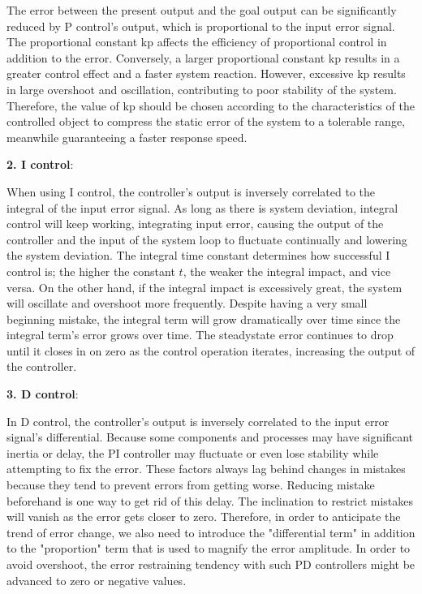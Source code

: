 \documentclass[12pt, a4paper, oneside]{report}
\begin{document}
The error between the present output and the goal output can be significantly reduced by P control's output, which is proportional to the input error signal. The proportional constant kp affects the efficiency of proportional control in addition to the error. Conversely, a larger proportional constant kp results in a greater control effect and a faster system reaction. However, excessive kp results in large overshoot and oscillation, contributing to poor stability of the system. Therefore, the value of kp should be chosen according to the characteristics of the controlled object to compress the static error of the system to a tolerable range, meanwhile guaranteeing a faster response speed.

\textbf{2. I control}: 

When using I control, the controller's output is inversely correlated to the integral of the input error signal. As long as there is system deviation, integral control will keep working, integrating input error, causing the output of the controller and the input of the system loop to fluctuate continually and lowering the system deviation. The integral time constant determines how successful I control is; the higher the constant $t$, the weaker the integral impact, and vice versa. On the other hand, if the integral impact is excessively great, the system will oscillate and overshoot more frequently. Despite having a very small beginning mistake, the integral term will grow dramatically over time since the integral term's error grows over time. The steadystate error continues to drop until it closes in on zero as the control operation iterates, increasing the output of the controller.

\textbf{3. D control}: 

In D control, the controller's output is inversely correlated to the input error signal's differential. Because some components and processes may have significant inertia or delay, the PI controller may fluctuate or even lose stability while attempting to fix the error. These factors always lag behind changes in mistakes because they tend to prevent errors from getting worse. Reducing mistake beforehand is one way to get rid of this delay. The inclination to restrict mistakes will vanish as the error gets closer to zero. Therefore, in order to anticipate the trend of error change, we also need to introduce the "differential term" in addition to the "proportion" term that is used to magnify the error amplitude. In order to avoid overshoot, the error restraining tendency with such PD controllers might be advanced to zero or negative values.
\end{document}
